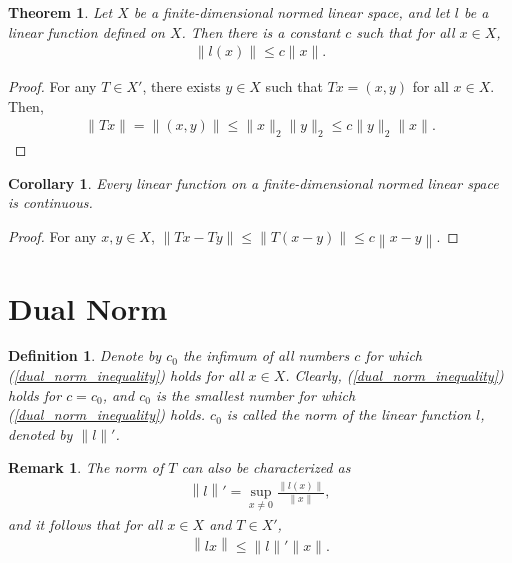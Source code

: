 \documentclass[10pt]{book}
\newtheorem{definition}{Definition}[chapter]
\newtheorem{theorem}{Theorem}[chapter]
\newtheorem{corollary}{Corollary}[theorem]
\newtheorem{remark}{Remark}[chapter]
\theoremstyle{definition}
\numberwithin{equation}{chapter}
\begin{document}
\medskip

\begin{theorem}
Let $X$ be a finite-dimensional normed linear space, and let $l$ be a linear function defined on $X$. Then there is a constant $c$ such that for all $x \in X$,
\begin{align}\label{dual_norm_inequality}
    \|l(x)\| \leq c \|x\|.
\end{align}
\end{theorem}
\begin{proof}
For any $T \in X'$, there exists $y \in X$ such that $Tx = (x, y)$ for all $x \in X$. Then,
\begin{align*}
    \|Tx\| = \|(x,y)\| \leq \|x\|_2 \|y\|_2 \leq c \|y\|_2 \|x\|.
\end{align*}
\end{proof}

\medskip

\begin{corollary}\label{linear_function_continuous}
Every linear function on a finite-dimensional normed linear space is continuous.
\end{corollary}
\begin{proof}
For any $x, y \in X$, $\left\|Tx - Ty\right\| \leq \left\|T(x - y)\right\| \leq c \left\|x - y\right\|$.
\end{proof}

\medskip

\section{Dual Norm}

\begin{definition}
Denote by $c_0$ the infimum of all numbers $c$ for which (\ref{dual_norm_inequality}) holds for all $x \in X$. Clearly, (\ref{dual_norm_inequality}) holds for $c = c_0$, and $c_0$ is the smallest number for which (\ref{dual_norm_inequality}) holds. $c_0$ is called the norm of the linear function $l$, denoted by $\|l\|'$.
\end{definition}

\begin{remark}
The norm of $T$ can also be characterized as
\begin{align}\label{linear_function_norm}
    \left\|l\right\|' = \sup_{x \neq 0} \frac{\|l(x)\|}{\|x\|},
\end{align}
and it follows that for all $x \in X$ and $T \in X'$,
\begin{align}\label{equ_14_5}
    \left\|lx\right\| \leq \|l\|' \|x\|.
\end{align}
\end{remark}
\end{document}
